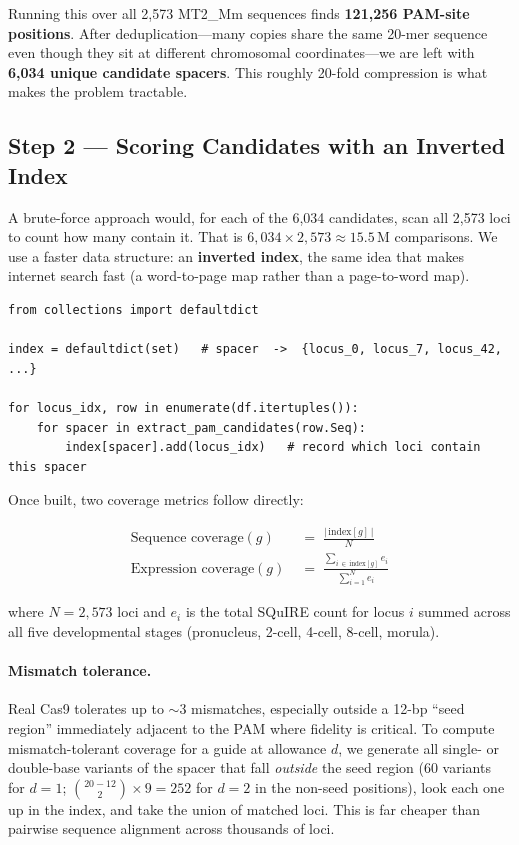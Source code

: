 \documentclass[11pt]{article}
\begin{document}
Running this over all 2,573 MT2\_Mm sequences finds \textbf{121,256 PAM-site positions}.
After deduplication---many copies share the same 20-mer sequence even though they sit at
different chromosomal coordinates---we are left with \textbf{6,034 unique candidate spacers}.
This roughly 20-fold compression is what makes the problem tractable.

\subsection{Step 2 --- Scoring Candidates with an Inverted Index}

A brute-force approach would, for each of the 6,034 candidates, scan all 2,573 loci to
count how many contain it.  That is $6{,}034 \times 2{,}573 \approx 15.5\,\mathrm{M}$
comparisons.  We use a faster data structure: an \textbf{inverted index}, the same idea
that makes internet search fast (a word-to-page map rather than a page-to-word map).

\begin{lstlisting}[style=pycode,
  caption={Building the inverted index.  After this runs once, any coverage query
    is an O(1) dictionary look-up.}]
from collections import defaultdict

index = defaultdict(set)   # spacer  ->  {locus_0, locus_7, locus_42, ...}

for locus_idx, row in enumerate(df.itertuples()):
    for spacer in extract_pam_candidates(row.Seq):
        index[spacer].add(locus_idx)   # record which loci contain this spacer
\end{lstlisting}

Once built, two coverage metrics follow directly:

\begin{align}
  \text{Sequence coverage}(g) &\;=\;
    \frac{\bigl|\,\mathrm{index}[g]\,\bigr|}{N}
  \label{eq:scm} \\[4pt]
  \text{Expression coverage}(g) &\;=\;
    \frac{\displaystyle\sum_{i\,\in\,\mathrm{index}[g]} e_i}
         {\displaystyle\sum_{i=1}^{N} e_i}
  \label{eq:ewcm}
\end{align}

where $N = 2{,}573$ loci and $e_i$ is the total SQuIRE count for locus $i$ summed across
all five developmental stages (pronucleus, 2-cell, 4-cell, 8-cell, morula).

\paragraph{Mismatch tolerance.}
Real Cas9 tolerates up to $\sim$3 mismatches, especially outside a 12-bp ``seed region''
immediately adjacent to the PAM where fidelity is critical.  To compute mismatch-tolerant
coverage for a guide at allowance $d$, we generate all single- or double-base variants of
the spacer that fall \emph{outside} the seed region (60 variants for $d{=}1$;
$\binom{20-12}{2}\times 9 = 252$ for $d{=}2$ in the non-seed positions), look each one up
in the index, and take the union of matched loci.  This is far cheaper than pairwise
sequence alignment across thousands of loci.
\end{document}
